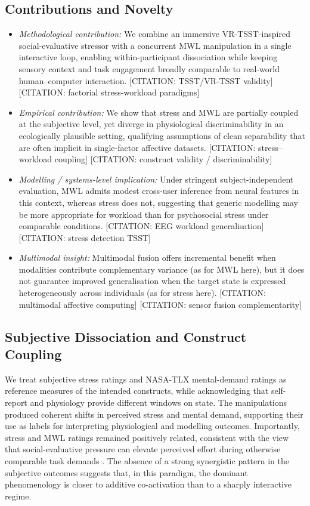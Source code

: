 \documentclass[lettersize,journal]{IEEEtran}
\begin{document}
\subsection{Contributions and Novelty}
\begin{itemize}
    \item \textit{Methodological contribution:} We combine an immersive VR-TSST-inspired social-evaluative stressor with a concurrent MWL manipulation in a single interactive loop, enabling within-participant dissociation while keeping sensory context and task engagement broadly comparable to real-world human--computer interaction. [CITATION: TSST/VR-TSST validity] [CITATION: factorial stress-workload paradigms]
    \item \textit{Empirical contribution:} We show that stress and MWL are partially coupled at the subjective level, yet diverge in physiological discriminability in an ecologically plausible setting, qualifying assumptions of clean separability that are often implicit in single-factor affective datasets. [CITATION: stress--workload coupling] [CITATION: construct validity / discriminability]
    \item \textit{Modelling / systems-level implication:} Under stringent subject-independent evaluation, MWL admits modest cross-user inference from neural features in this context, whereas stress does not, suggesting that generic modelling may be more appropriate for workload than for psychosocial stress under comparable conditions. [CITATION: EEG workload generalisation] [CITATION: stress detection TSST]
    \item \textit{Multimodal insight:} Multimodal fusion offers incremental benefit when modalities contribute complementary variance (as for MWL here), but it does not guarantee improved generalisation when the target state is expressed heterogeneously across individuals (as for stress here). [CITATION: multimodal affective computing] [CITATION: sensor fusion complementarity]
\end{itemize}

\subsection{Subjective Dissociation and Construct Coupling}
We treat subjective stress ratings and NASA-TLX mental-demand ratings as reference measures of the intended constructs, while acknowledging that self-report and physiology provide different windows on state. The manipulations produced coherent shifts in perceived stress and mental demand, supporting their use as labels for interpreting physiological and modelling outcomes. Importantly, stress and MWL ratings remained positively related, consistent with the view that social-evaluative pressure can elevate perceived effort during otherwise comparable task demands \cite{wetherell_psychobiological_2017}. The absence of a strong synergistic pattern in the subjective outcomes suggests that, in this paradigm, the dominant phenomenology is closer to additive co-activation than to a sharply interactive regime.
\end{document}
